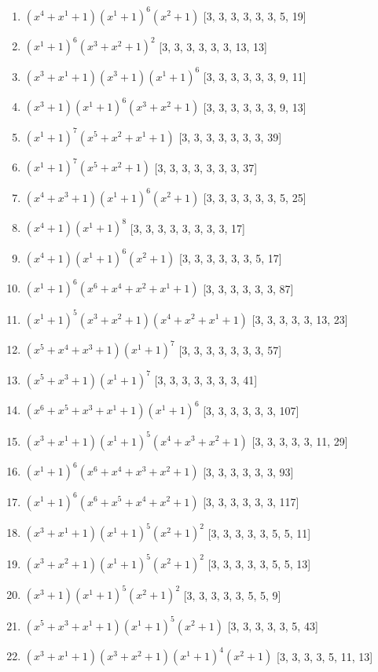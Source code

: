 \documentclass[10pt,twocolumn]{article}
\begin{document}
\begin{enumerate}
\item $(x^{4} + x^{1} + 1)(x^{1} + 1)^{6}(x^{2} + 1)$  [3, 3, 3, 3, 3, 3, 5, 19]
\item $(x^{1} + 1)^{6}(x^{3} + x^{2} + 1)^{2}$  [3, 3, 3, 3, 3, 3, 13, 13]
\item $(x^{3} + x^{1} + 1)(x^{3} + 1)(x^{1} + 1)^{6}$  [3, 3, 3, 3, 3, 3, 9, 11]
\item $(x^{3} + 1)(x^{1} + 1)^{6}(x^{3} + x^{2} + 1)$  [3, 3, 3, 3, 3, 3, 9, 13]
\item $(x^{1} + 1)^{7}(x^{5} + x^{2} + x^{1} + 1)$  [3, 3, 3, 3, 3, 3, 3, 39]
\item $(x^{1} + 1)^{7}(x^{5} + x^{2} + 1)$  [3, 3, 3, 3, 3, 3, 3, 37]
\item $(x^{4} + x^{3} + 1)(x^{1} + 1)^{6}(x^{2} + 1)$  [3, 3, 3, 3, 3, 3, 5, 25]
\item $(x^{4} + 1)(x^{1} + 1)^{8}$  [3, 3, 3, 3, 3, 3, 3, 3, 17]
\item $(x^{4} + 1)(x^{1} + 1)^{6}(x^{2} + 1)$  [3, 3, 3, 3, 3, 3, 5, 17]
\item $(x^{1} + 1)^{6}(x^{6} + x^{4} + x^{2} + x^{1} + 1)$  [3, 3, 3, 3, 3, 3, 87]
\item $(x^{1} + 1)^{5}(x^{3} + x^{2} + 1)(x^{4} + x^{2} + x^{1} + 1)$  [3, 3, 3, 3, 3, 13, 23]
\item $(x^{5} + x^{4} + x^{3} + 1)(x^{1} + 1)^{7}$  [3, 3, 3, 3, 3, 3, 3, 57]
\item $(x^{5} + x^{3} + 1)(x^{1} + 1)^{7}$  [3, 3, 3, 3, 3, 3, 3, 41]
\item $(x^{6} + x^{5} + x^{3} + x^{1} + 1)(x^{1} + 1)^{6}$  [3, 3, 3, 3, 3, 3, 107]
\item $(x^{3} + x^{1} + 1)(x^{1} + 1)^{5}(x^{4} + x^{3} + x^{2} + 1)$  [3, 3, 3, 3, 3, 11, 29]
\item $(x^{1} + 1)^{6}(x^{6} + x^{4} + x^{3} + x^{2} + 1)$  [3, 3, 3, 3, 3, 3, 93]
\item $(x^{1} + 1)^{6}(x^{6} + x^{5} + x^{4} + x^{2} + 1)$  [3, 3, 3, 3, 3, 3, 117]
\item $(x^{3} + x^{1} + 1)(x^{1} + 1)^{5}(x^{2} + 1)^{2}$  [3, 3, 3, 3, 3, 5, 5, 11]
\item $(x^{3} + x^{2} + 1)(x^{1} + 1)^{5}(x^{2} + 1)^{2}$  [3, 3, 3, 3, 3, 5, 5, 13]
\item $(x^{3} + 1)(x^{1} + 1)^{5}(x^{2} + 1)^{2}$  [3, 3, 3, 3, 3, 5, 5, 9]
\item $(x^{5} + x^{3} + x^{1} + 1)(x^{1} + 1)^{5}(x^{2} + 1)$  [3, 3, 3, 3, 3, 5, 43]
\item $(x^{3} + x^{1} + 1)(x^{3} + x^{2} + 1)(x^{1} + 1)^{4}(x^{2} + 1)$  [3, 3, 3, 3, 5, 11, 13]

\end{enumerate}
\end{document}
